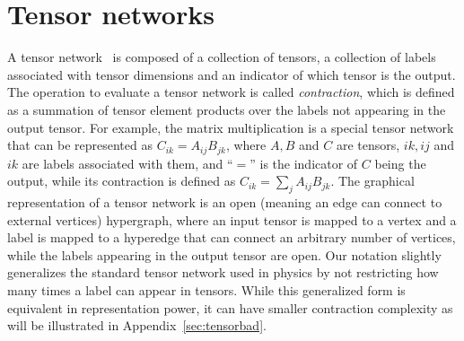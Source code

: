 \documentclass[onefignum, onetabnum]{siamart190516}
\newcommand{\<}{\langle}
\renewcommand{\>}{\rangle}
\newcommand{\App}[1]{Appendix~\ref{#1}}
\newcounter{example}
\begin{document}
\section{Tensor networks}\label{sec:tn}
A tensor network~\cite{Cirac2020, Orus2014} is composed of a collection of tensors, a collection of labels associated with tensor dimensions and an indicator of which tensor is the output.
The operation to evaluate a tensor network is called \textit{contraction}, which is defined as a summation of tensor element products over the labels not appearing in the output tensor.
For example, the matrix multiplication is a special tensor network that can be represented as $C_{ik} = A_{ij}B_{jk}$, where $A, B$ and $C$ are tensors, $ik,ij$ and $ik$ are labels associated with them, and ``$=$'' is the indicator of $C$ being the output, while its contraction is defined as $C_{ik} = \sum_j A_{ij}B_{jk}$.
The graphical representation of a tensor network is an open (meaning an edge can connect to external vertices) hypergraph, where an input tensor is mapped to a vertex and a label is mapped to a hyperedge that can connect an arbitrary number of vertices, while the labels appearing in the output tensor are open.
Our notation slightly generalizes the standard tensor network used in physics by not restricting how many times a label can appear in tensors. 
While this generalized form is equivalent in representation power, it can have smaller contraction complexity as will be illustrated in \App{sec:tensorbad}.
\end{document}
